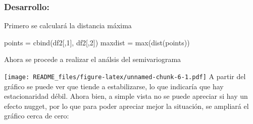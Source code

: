 \documentclass[
]{article}
\newenvironment{Shaded}{\begin{snugshade}}{\end{snugshade}}
\newcommand{\AttributeTok}[1]{\textcolor[rgb]{0.77,0.63,0.00}{#1}}
\newcommand{\DecValTok}[1]{\textcolor[rgb]{0.00,0.00,0.81}{#1}}
\newcommand{\FloatTok}[1]{\textcolor[rgb]{0.00,0.00,0.81}{#1}}
\newcommand{\FunctionTok}[1]{\textcolor[rgb]{0.00,0.00,0.00}{#1}}
\newcommand{\NormalTok}[1]{#1}
\newcommand{\OtherTok}[1]{\textcolor[rgb]{0.56,0.35,0.01}{#1}}
\newcommand{\SpecialCharTok}[1]{\textcolor[rgb]{0.00,0.00,0.00}{#1}}
\begin{document}
\hypertarget{desarrollo-2}{%
\subsubsection{Desarrollo:}\label{desarrollo-2}}

Primero se calculará la distancia máxima

\begin{Shaded}
\begin{Highlighting}[]
\NormalTok{points }\OtherTok{=} \FunctionTok{cbind}\NormalTok{(df2[,}\DecValTok{1}\NormalTok{], df2[,}\DecValTok{2}\NormalTok{])}
\NormalTok{maxdist }\OtherTok{=} \FunctionTok{max}\NormalTok{(}\FunctionTok{dist}\NormalTok{(points))}
\end{Highlighting}
\end{Shaded}

Ahora se procede a realizar el análsis del semivariograma

\begin{Shaded}
\end{Shaded}

\texttt{[image: README\_files/figure-latex/unnamed-chunk-6-1.pdf]} A
partir del gráfico se puede ver que tiende a estabilizarse, lo que
indicaría que hay estacionaridad débil. Ahora bien, a simple vista no se
puede apreciar si hay un efecto nugget, por lo que para poder apreciar
mejor la situación, se ampliará el gráfico cerca de cero:

\begin{Shaded}
\end{Shaded}
\end{document}
